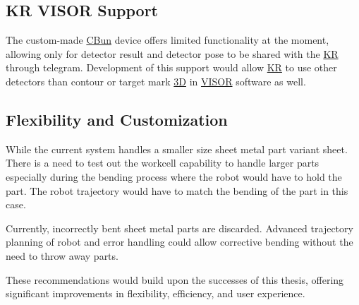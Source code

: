\subsection{KR VISOR Support}
The custom-made \hyperref[acro:CBun]{CBun} device offers limited functionality at the moment, allowing only for detector result and detector pose to be shared with the \hyperref[acro:KR]{KR} through telegram. Development of this support would allow \hyperref[acro:KR]{KR} to use other detectors than contour or target mark \hyperref[acro:3D]{3D} in \hyperref[acro:VISOR]{VISOR}\textsuperscript{\textregistered} software as well.

\subsection{Flexibility and Customization}

While the current system handles a smaller size sheet metal part variant sheet. There is a need to test out the workcell capability to handle larger parts especially during the bending process where the robot would have to hold the part. The robot trajectory would have to match the bending of the part in this case.

Currently, incorrectly bent sheet metal parts are discarded. Advanced trajectory planning of robot and error handling could allow corrective bending without the need to throw away parts.


\vspace{1\baselineskip}
These recommendations would build upon the successes of this thesis, offering significant improvements in flexibility, efficiency, and user experience.